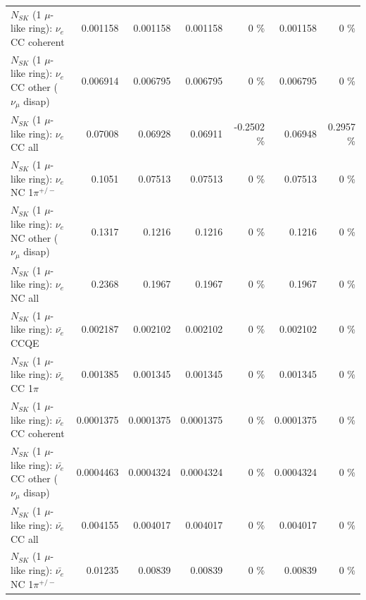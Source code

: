 \begin{table}
\begin{tabular}{| l | r | r | r  r | r  r |}
                               $N_{SK}$ (1 $\mu$-like ring): $\nu_e$ CC coherent &        0.001158 &        0.001158 &        0.001158 &        0 \%  &        0.001158 &        0 \%  \\ 
                $N_{SK}$ (1 $\mu$-like ring): $\nu_e$ CC other ($\nu_\mu$ disap) &        0.006914 &        0.006795 &        0.006795 &        0 \%  &        0.006795 &        0 \%  \\ 
                                  $N_{SK}$ (1 $\mu$-like ring): $\nu_{e}$ CC all &         0.07008 &         0.06928 &         0.06911 &  -0.2502 \%  &         0.06948 &   0.2957 \%  \\ 
\hline
                           $N_{SK}$ (1 $\mu$-like ring): $\nu_e$ NC 1$\pi^{+/-}$ &          0.1051 &         0.07513 &         0.07513 &        0 \%  &         0.07513 &        0 \%  \\ 
                $N_{SK}$ (1 $\mu$-like ring): $\nu_e$ NC other ($\nu_\mu$ disap) &          0.1317 &          0.1216 &          0.1216 &        0 \%  &          0.1216 &        0 \%  \\ 
                                  $N_{SK}$ (1 $\mu$-like ring): $\nu_{e}$ NC all &          0.2368 &          0.1967 &          0.1967 &        0 \%  &          0.1967 &        0 \%  \\ 
\hline
\hline
\hline
                                $N_{SK}$ (1 $\mu$-like ring): $\bar{\nu_e}$ CCQE &        0.002187 &        0.002102 &        0.002102 &        0 \%  &        0.002102 &        0 \%  \\ 
                           $N_{SK}$ (1 $\mu$-like ring): $\bar{\nu_e}$ CC 1$\pi$ &        0.001385 &        0.001345 &        0.001345 &        0 \%  &        0.001345 &        0 \%  \\ 
                         $N_{SK}$ (1 $\mu$-like ring): $\bar{\nu_e}$ CC coherent &       0.0001375 &       0.0001375 &       0.0001375 &        0 \%  &       0.0001375 &        0 \%  \\ 
          $N_{SK}$ (1 $\mu$-like ring): $\bar{\nu_e}$ CC other ($\nu_\mu$ disap) &       0.0004463 &       0.0004324 &       0.0004324 &        0 \%  &       0.0004324 &        0 \%  \\ 
                            $N_{SK}$ (1 $\mu$-like ring): $\bar{\nu_{e}}$ CC all &        0.004155 &        0.004017 &        0.004017 &        0 \%  &        0.004017 &        0 \%  \\ 
\hline
                     $N_{SK}$ (1 $\mu$-like ring): $\bar{\nu_e}$ NC 1$\pi^{+/-}$ &         0.01235 &         0.00839 &         0.00839 &        0 \%  &         0.00839 &        0 \%  \\ 

\end{tabular}
\end{table}
